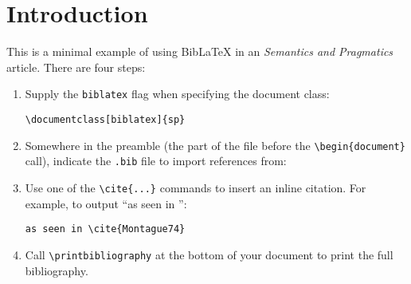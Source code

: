 \documentclass[biblatex]{sp}
\begin{document}
\section{Introduction}

This is a minimal example of using BibLaTeX in an \emph{Semantics and Pragmatics} article. There are four steps:

\begin{enumerate}
  \item Supply the \texttt{biblatex} flag when specifying the document class:

    \verb+\documentclass[biblatex]{sp}+

  \item Somewhere in the preamble (the part of the file before the \verb+\begin{document}+ call), indicate the \texttt{.bib} file to import references from:

    \verb++

  \item Use one of the \verb+\cite{...}+ commands to insert an inline citation. For example, to output ``as seen in \cite{Montague74}'':

    \verb+as seen in \cite{Montague74}+

  \item Call \verb+\printbibliography+ at the bottom of your document to print the full bibliography.
\end{enumerate}

\printbibliography
\end{document}
